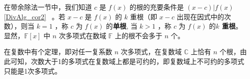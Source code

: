 在带余除法一节中，我们知道 $c$ 是 $f(x)$ 的根的充要条件是 $(x-c)|f(x)$ \autoref{DivAlg_cor2}~ 。若 $x-c$ 是 $f(x)$ 的 $k$ 重根（即 $x-c$ 出现在因式中的次数），则当 $k=1$ ，称 $c$ 为 $f(x)$ 的\textbf{单根}, 当 $k>1$ ，称 $c$ 为 $f(x)$ 的\textbf{$k$ 重根}。显然，$\mathbb{F}[x]$ 中 $n$ 次多项式在数域 $\mathbb{F}$ 上的根不会多于 $n$ 个。

在复数中有个定理，即对任一复系数 $n$ 次多项式，在复数域 $\mathbb{C}$ 上恰有 $n$ 个根，由此可知，次数大于1的多项式在复数域上都是可约的，即复数域上不可约的多项式只能是1次多项式。
